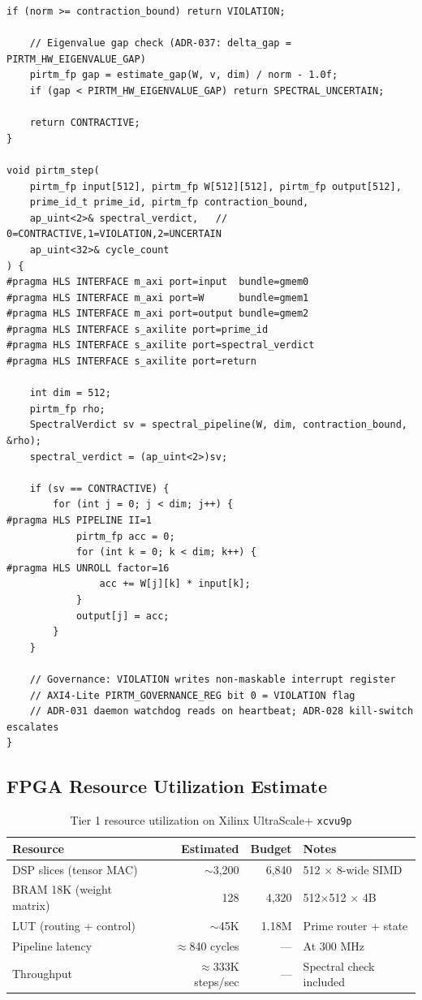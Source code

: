 \documentclass[12pt,letterpaper]{article}
\theoremstyle{plain}
\theoremstyle{definition}
\theoremstyle{remark}
\begin{document}
\begin{lstlisting}[style=cppstyle, caption={HLS kernel \texttt{pirtm\_step\_kernel.cpp}}, label=lst:hls]
    if (norm >= contraction_bound) return VIOLATION;

    // Eigenvalue gap check (ADR-037: delta_gap = PIRTM_HW_EIGENVALUE_GAP)
    pirtm_fp gap = estimate_gap(W, v, dim) / norm - 1.0f;
    if (gap < PIRTM_HW_EIGENVALUE_GAP) return SPECTRAL_UNCERTAIN;

    return CONTRACTIVE;
}

void pirtm_step(
    pirtm_fp input[512], pirtm_fp W[512][512], pirtm_fp output[512],
    prime_id_t prime_id, pirtm_fp contraction_bound,
    ap_uint<2>& spectral_verdict,   // 0=CONTRACTIVE,1=VIOLATION,2=UNCERTAIN
    ap_uint<32>& cycle_count
) {
#pragma HLS INTERFACE m_axi port=input  bundle=gmem0
#pragma HLS INTERFACE m_axi port=W      bundle=gmem1
#pragma HLS INTERFACE m_axi port=output bundle=gmem2
#pragma HLS INTERFACE s_axilite port=prime_id
#pragma HLS INTERFACE s_axilite port=spectral_verdict
#pragma HLS INTERFACE s_axilite port=return

    int dim = 512;
    pirtm_fp rho;
    SpectralVerdict sv = spectral_pipeline(W, dim, contraction_bound, &rho);
    spectral_verdict = (ap_uint<2>)sv;

    if (sv == CONTRACTIVE) {
        for (int j = 0; j < dim; j++) {
#pragma HLS PIPELINE II=1
            pirtm_fp acc = 0;
            for (int k = 0; k < dim; k++) {
#pragma HLS UNROLL factor=16
                acc += W[j][k] * input[k];
            }
            output[j] = acc;
        }
    }

    // Governance: VIOLATION writes non-maskable interrupt register
    // AXI4-Lite PIRTM_GOVERNANCE_REG bit 0 = VIOLATION flag
    // ADR-031 daemon watchdog reads on heartbeat; ADR-028 kill-switch escalates
}
\end{lstlisting}

\subsection{FPGA Resource Utilization Estimate}

\begin{table}[H]
\centering
\caption{Tier 1 resource utilization on Xilinx UltraScale+ \texttt{xcvu9p}}
\label{tab:resources}
\begin{tabular}{lrrl}
\toprule
\textbf{Resource} & \textbf{Estimated} & \textbf{Budget} & \textbf{Notes} \\
\midrule
DSP slices (tensor MAC)     & $\sim$3,200 & 6,840    & 512 $\times$ 8-wide SIMD \\
BRAM 18K (weight matrix)    & 128         & 4,320    & 512$\times$512 $\times$ 4B \\
LUT (routing + control)     & $\sim$45K   & 1.18M    & Prime router + state \\
Pipeline latency            & $\approx$840 cycles & --- & At 300 MHz \\
Throughput                  & $\approx$333K steps/sec & --- & Spectral check included \\
\bottomrule
\end{tabular}
\end{table}
\end{document}
